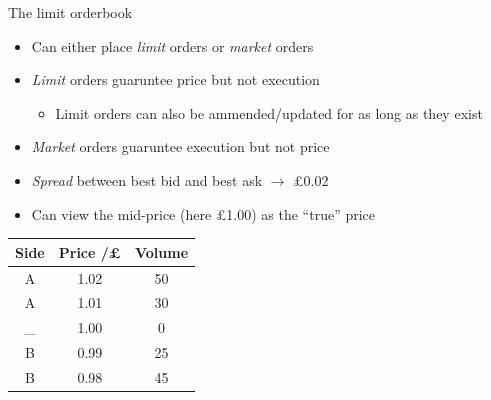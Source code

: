 \documentclass{beamer} %
\begin{document}
\begin{frame}{The limit orderbook}
    \begin{itemize}
        \item Can either place \emph{limit} orders or \emph{market} orders
        \item \emph{Limit} orders guaruntee price but not execution
        \begin{itemize}
            \item Limit orders can also be ammended/updated for as long as they exist
        \end{itemize}
        \item \emph{Market} orders guaruntee execution but not price
        \item \emph{Spread} between best bid and best ask $\rightarrow$ £0.02
        \item Can view the mid-price (here £1.00) as the ``true'' price
    \end{itemize}
    \begin{center}
        \begin{tabular}{ |c|c|c| } 
            \hline
            Side & Price /£ & Volume \\ 
            \hline
            A & 1.02 & 50 \\
            A & 1.01 & 30 \\
            \_ & 1.00 & 0 \\
            B & 0.99 & 25 \\ 
            B & 0.98 & 45 \\
            \hline
        \end{tabular}
    \end{center}
\end{frame}
\end{document}
